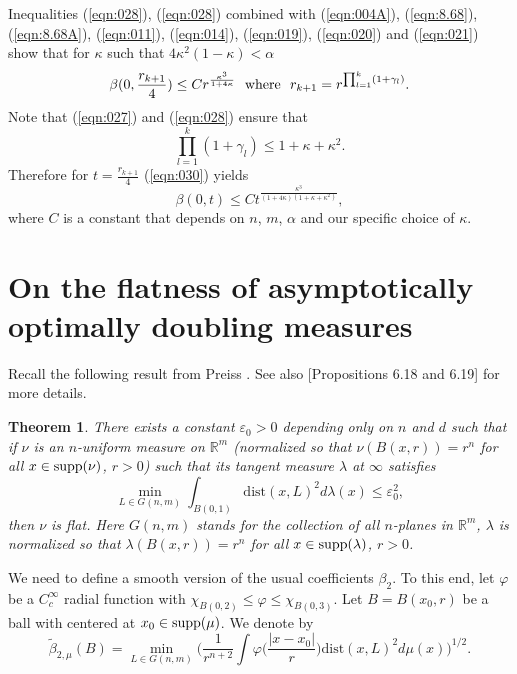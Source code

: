 \documentclass[12pt,leqno]{article}
\newcommand{\supp}{{\rm supp}}
\newcommand{\vphi}{{\varphi}}
\newcommand{\wt}[1]{{\widetilde{#1}}}
\newcommand{\RR}{\mathbb{R}}
\newcommand{\ve}{{\varepsilon}}
\newcommand{\dist}{\mathrm{dist}}
\theoremstyle{plain}
\newtheorem{thm}{Theorem}[section]
\numberwithin{equation}{section}
\begin{document}
Inequalities (\ref{eqn:028}), (\ref{eqn:028}) combined with (\ref{eqn:004A}), (\ref{eqn:8.68}),
(\ref{eqn:8.68A}), (\ref{eqn:011}),
(\ref{eqn:014}), (\ref{eqn:019}),
(\ref{eqn:020}) and (\ref{eqn:021}) show that for $\kappa$ such that
$4\kappa^2(1-\kappa)<\alpha$
\begin{equation}\label{eqn:030}
\beta(0,\frac{r_{k+1}}{4})\le C r^{\frac{\kappa^3}{1+4\kappa}}
\ \hbox{ where }\ r_{k+1}= r^{\prod^{k}_{l=1}(1+\gamma_l)}.
\end{equation}
Note that (\ref{eqn:027}) and (\ref{eqn:028}) ensure that
\begin{equation}\label{eqn:031}
\prod^{k}_{l=1}(1+\gamma_l)\le 1+\kappa+\kappa^2.
\end{equation}
Therefore for $t=\frac{r_{k+1}}{4}$ (\ref{eqn:030}) yields
\begin{equation}\label{eqn:032}
\beta(0,t)\le C t^{\frac{\kappa^3}{(1+4\kappa)(1+\kappa+\kappa^2)}},
\end{equation}
where $C$ is a constant that depends on $n$, $m$, $\alpha$ and
our specific choice of $\kappa$.




\section{On the flatness of asymptotically optimally doubling measures}


Recall the following result from Preiss \cite{Pr}. See also
\cite{DeL} [Propositions 6.18 and 6.19] for more details.

\begin{thm}\label{teopreiss}
There exists a constant $\ve_0>0$ depending only on $n$ and $d$ such
that if $\nu$ is an $n$-uniform measure on $\RR^m$ (normalized so
that $\nu(B(x,r))= r^n$ for all $x\in\supp(\nu)$, $r>0$) such that
its tangent measure $\lambda$ at $\infty$ satisfies
\begin{equation}\label{infty}
\min_{L\in G(n,m)} \int_{B(0,1)}\dist(x,L)^2d\lambda(x)  \leq \ve_0^2,
\end{equation}
then $\nu$ is flat.
Here $G(n,m)$ stands for the collection  of all
$n$-planes in $\RR^m$, $\lambda$ is normalized so that
$\lambda(B(x,r))= r^n$ for all $x\in\supp(\lambda)$, $r>0$.
\end{thm}


We need to define a smooth version of the usual coefficients
$\beta_2$. To this end, let $\vphi$ be a $C_c^\infty$ radial
function with $\chi_{B(0,2)}\leq \vphi \leq \chi_{B(0,3)}$.
Let $B=B(x_0,r)$ be a ball with centered at $x_0\in\supp(\mu)$. We denote by
\begin{equation}
\wt\beta_{2,\mu}(B) =
\min_{L\in G(n,m)} \biggl( \frac1{r^{n+2}}\int
\vphi\biggl(\frac{|x-x_0|}r\biggr)
\dist(x,L)^2d\mu(x)\biggr)^{1/2}.
\end{equation}
\end{document}
